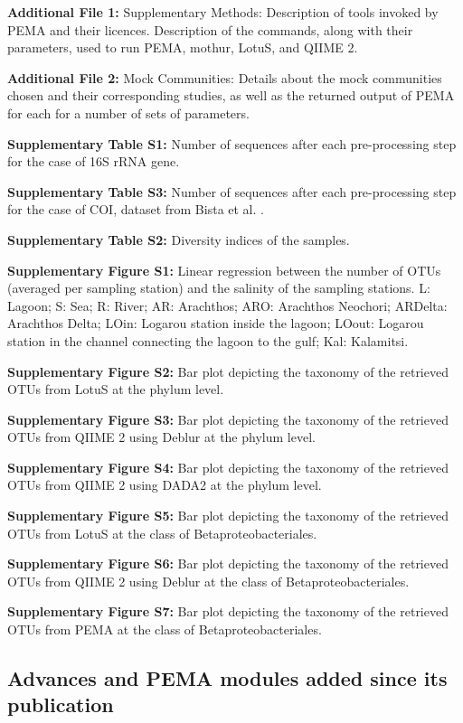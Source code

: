       \textbf{Additional File 1:} Supplementary Methods: Description of tools invoked by PEMA and their licences. Description of the commands, along with their parameters, used to run PEMA, mothur, LotuS, and QIIME 2.

      \textbf{Additional File 2:} Mock Communities: Details about the mock communities chosen and their corresponding studies, as well as the returned output of PEMA for each for a number of sets of parameters.

      \textbf{Supplementary Table S1:} Number of sequences after each pre-processing step for the case of 16S rRNA gene.

      \textbf{Supplementary Table S3:} Number of sequences after each pre-processing step for the case of COI, dataset from Bista et al. \citep{bista2017annual}.

      \textbf{Supplementary Table S2:} Diversity indices of the samples.

      \textbf{Supplementary Figure S1:} Linear regression between the number of OTUs (averaged per sampling station) and the salinity of the sampling stations. L: Lagoon; S: Sea; R: River; AR: Arachthos; ARO: Arachthos Neochori; ARDelta: Arachthos Delta; LOin: Logarou station inside the lagoon; LOout: Logarou station in the channel connecting the lagoon to the gulf; Kal: Kalamitsi.

      \textbf{Supplementary Figure S2:} Bar plot depicting the taxonomy of the retrieved OTUs from LotuS at the phylum level.

      \textbf{Supplementary Figure S3:} Bar plot depicting the taxonomy of the retrieved OTUs from QIIME 2 using Deblur at the phylum level.

      \textbf{Supplementary Figure S4:} Bar plot depicting the taxonomy of the retrieved OTUs from QIIME 2 using DADA2 at the phylum level.

      \textbf{Supplementary Figure S5:} Bar plot depicting the taxonomy of the retrieved OTUs from LotuS at the class of Betaproteobacteriales.

      \textbf{Supplementary Figure S6:} Bar plot depicting the taxonomy of the retrieved OTUs from QIIME 2 using Deblur at the class of Betaproteobacteriales.

      \textbf{Supplementary Figure S7:} Bar plot depicting the taxonomy of the retrieved OTUs from PEMA at the class of Betaproteobacteriales.
   \fi

   \subsection{Advances and PEMA modules added since its publication}

